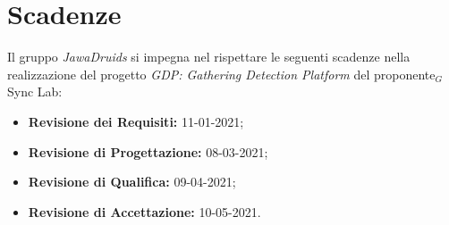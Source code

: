 \section{Scadenze} \label{IntroduzioneScadenze}
Il gruppo \textit{JawaDruids} si impegna nel rispettare le seguenti scadenze nella realizzazione del progetto \textit{GDP: Gathering Detection Platform} del proponente$_G$ Sync Lab:
\begin{itemize}
	\item \textbf{Revisione dei Requisiti:} 11-01-2021;
	\item \textbf{Revisione di Progettazione:} 08-03-2021;
	\item \textbf{Revisione di Qualifica:} 09-04-2021;
	\item \textbf{Revisione di Accettazione:} 10-05-2021.
\end{itemize}
